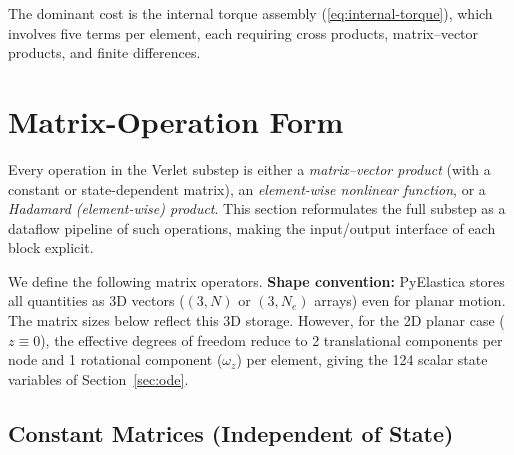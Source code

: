 \documentclass[11pt]{article}
\begin{document}
\noindent
The dominant cost is the internal torque assembly (\ref{eq:internal-torque}), which involves five terms per element, each requiring cross products, matrix--vector products, and finite differences.

\section{Matrix-Operation Form}
\label{sec:matrix-form}

Every operation in the Verlet substep is either a \emph{matrix--vector product} (with a constant or state-dependent matrix), an \emph{element-wise nonlinear function}, or a \emph{Hadamard (element-wise) product}.
This section reformulates the full substep as a dataflow pipeline of such operations, making the input/output interface of each block explicit.

We define the following matrix operators.
\textbf{Shape convention:} PyElastica stores all quantities as 3D vectors ($(3, N)$ or $(3, N_e)$ arrays) even for planar motion.
The matrix sizes below reflect this 3D storage.
However, for the 2D planar case ($z \equiv 0$), the effective degrees of freedom reduce to 2 translational components per node and 1 rotational component ($\omega_z$) per element, giving the 124 scalar state variables of Section~\ref{sec:ode}.

\subsection{Constant Matrices (Independent of State)}
\label{sec:constant-matrices}
\end{document}
